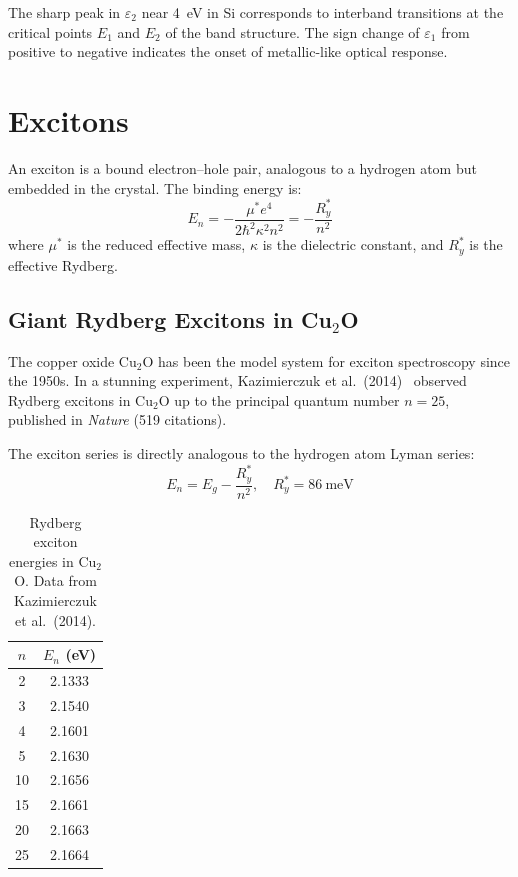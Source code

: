 The sharp peak in $\varepsilon_2$ near \SI{4}{\electronvolt} in Si corresponds to interband transitions at the critical points $E_1$ and $E_2$ of the band structure. The sign change of $\varepsilon_1$ from positive to negative indicates the onset of metallic-like optical response.


\section{Excitons}

An exciton is a bound electron--hole pair, analogous to a hydrogen atom but embedded in the crystal. The binding energy is:
\begin{equation}
  E_n = -\frac{\mu^* e^4}{2\hbar^2\kappa^2 n^2} = -\frac{R_y^*}{n^2}
\end{equation}
where $\mu^*$ is the reduced effective mass, $\kappa$ is the dielectric constant, and $R_y^*$ is the effective Rydberg.

\subsection{Giant Rydberg Excitons in Cu$_2$O}

The copper oxide Cu$_2$O has been the model system for exciton spectroscopy since the 1950s. In a stunning experiment, Kazimierczuk et al.\ (2014)~\cite{kazimierczuk2014exciton} observed Rydberg excitons in Cu$_2$O up to the principal quantum number $n = 25$, published in \textit{Nature} (519 citations).

The exciton series is directly analogous to the hydrogen atom Lyman series:
\begin{equation}
  E_n = E_g - \frac{R_y^*}{n^2}, \quad R_y^* = \SI{86}{\milli\electronvolt}
\end{equation}

\begin{table}[H]
\centering
\caption{Rydberg exciton energies in Cu$_2$O. Data from Kazimierczuk et al.\ (2014).}
\label{tab:exciton}
\begin{tabular}{@{}SS@{}}
\toprule
{$n$} & {$E_n$ (\si{\electronvolt})} \\
  & 2.1333 \\
3  & 2.1540 \\
4  & 2.1601 \\
5  & 2.1630 \\
10 & 2.1656 \\
15 & 2.1661 \\
20 & 2.1663 \\
25 & 2.1664 \\
\bottomrule
\end{tabular}
\end{table}

